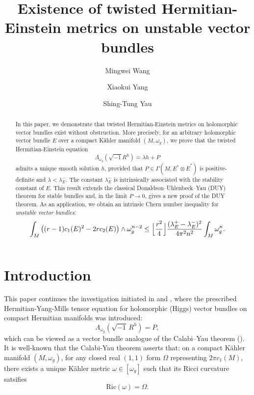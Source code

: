 \documentclass[12pt, reqno]{amsart}
\title{Existence of twisted Hermitian-Einstein metrics on unstable vector bundles}
\author{Mingwei Wang}
\author{Xiaokui Yang}
\author{Shing-Tung Yau}
\theoremstyle{plain}
\theoremstyle{definition}
\renewcommand{\bar}{\overline}
\newcommand{\beq}{\begin{equation}}
\newcommand{\eeq}{\end{equation}}
\newcommand{\Om}{\Omega}
\renewcommand{\>}{\rightarrow}
\renewcommand{\>}{\rightarrow}
\newcommand{\om}{\omega}
\renewcommand{\bar}{\overline}
\numberwithin{equation}{section} %
\begin{document}
    \begin{abstract} In this paper, we demonstrate that twisted Hermitian-Einstein metrics on holomorphic vector bundles exist without obstruction. More precisely, for an arbitrary  holomorphic vector bundle $E$ over a compact K\"ahler manifold $(M,\omega_g)$, we prove that the  twisted Hermitian-Einstein equation
    $$
    	\Lambda_{\omega_g}\left(\sqrt{-1}R^h\right) = \lambda h + P
    $$
    admits a unique smooth  solution $h$,  provided that  $P\in\Gamma(M,E^*\otimes\bar{E}^*)$ is  positive-definite and  $\lambda<\lambda_E^-$. The constant  $\lambda_E^-$ is intrinsically associated with the stability constant  of $E$.
This result extends the classical Donaldson–Uhlenbeck–Yau (DUY) theorem for stable  bundles and, in the limit $P\>0$, gives a new proof of the DUY theorem. As an application, we obtain an intrinsic Chern number inequality for \emph{unstable vector bundles}: $$\int_M \left((r-1)c_1(E)^2 - 2rc_2(E)\right) \wedge \omega_g^{n-2} \leq \Bigl\lfloor \frac{r^2}{4} \Bigr\rfloor \frac{(\lambda_E^+-\lambda_E^-)^2}{4\pi^2 n^2} \int_M \omega_g^n.$$
    \end{abstract}



\vspace*{-1\baselineskip} 
    \section{Introduction}


This paper continues the investigation initiated in \cite{WYY26+} and \cite{FWYY26+},  where  the prescribed Hermitian-Yang-Mills tensor equation for holomorphic (Higgs) vector bundles on compact Hermitian manifolds was introduced:
\beq \Lambda_{\om_g}\left(\sqrt{-1}\, R^h\right) =P, \label{PHYM}\eeq
which can be viewed as a vector bundle analogue of the Calabi–Yau theorem (\cite{Cal57,Yau78}). It is well-known that the Calabi-Yau theorem asserts that: on a compact K\"ahler manifold $(M,\omega_g)$,  for any closed real $(1,1)$ form $\Om$ representing $2\pi c_1(M)$,  there exists a unique K\"ahler metric $\omega\in [\omega_g]$ such that its  Ricci curvature satsifies \beq \mathrm{Ric}(\omega)=\Om.\label{CY}\eeq
\end{document}
